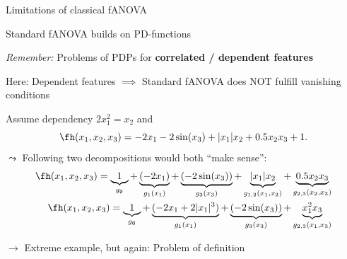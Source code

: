 \documentclass[10pt,compress,t,notes=noshow, xcolor=table]{beamer}
\begin{document}


\begin{framev}[align=top]{Limitations of classical fANOVA}
\begin{itemizeM}
\item Standard fANOVA builds on PD-functions
\item \textit{Remember:} Problems of PDPs for \textbf{correlated / dependent features}
\item Here: Dependent features $\implies$ Standard fANOVA does NOT fulfill vanishing conditions %
\end{itemizeM}
\pause
\begin{example}
Assume dependency $2x_1^2 = x_2$ and
$$
\fh(x_1, x_2, x_3) = - 2x_1 - 2\sin(x_3) + |x_1|x_2 + 0.5 x_2 x_3 + 1.
$$
$\leadsto$ Following two decompositions would both ``make sense'':
\begin{align*}
\fh(x_1, x_2, x_3)
= \underbrace{1}_{g_\emptyset}
+ \underbrace{(- 2x_1)}_{g_1(x_1)}
+ \underbrace{(- 2\sin(x_3))}_{g_3(x_3)}
+ \underbrace{|x_1|x_2}_{g_{1,2}(x_1, x_2)}
+ \underbrace{0.5 x_2 x_3}_{g_{2,3}(x_2, x_3)} \\
\fh(x_1, x_2, x_3)
= \underbrace{1}_{g_\emptyset}
+ \underbrace{(- 2x_1 + 2 |x_1|^3)}_{g_1(x_1)}
+ \underbrace{(- 2\sin(x_3))}_{g_3(x_3)}
+ \underbrace{x_1^2 x_3}_{g_{2,3}(x_1, x_3)}
\end{align*}
\end{example}
\pause
$\rightarrow$ Extreme example, but again: Problem of definition
\end{framev}
\end{document}

